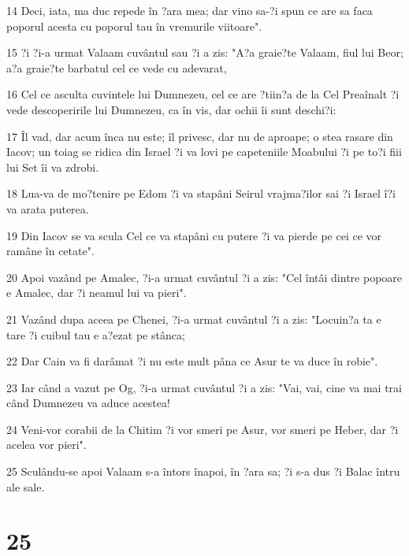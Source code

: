\par 14 Deci, iata, ma duc repede în ?ara mea; dar vino sa-?i spun ce are sa faca poporul acesta cu poporul tau în vremurile viitoare".
\par 15 ?i ?i-a urmat Valaam cuvântul sau ?i a zis: "A?a graie?te Valaam, fiul lui Beor; a?a graie?te barbatul cel ce vede cu adevarat,
\par 16 Cel ce asculta cuvintele lui Dumnezeu, cel ce are ?tiin?a de la Cel Preaînalt ?i vede descoperirile lui Dumnezeu, ca în vis, dar ochii îi sunt deschi?i:
\par 17 Îl vad, dar acum înca nu este; îl privesc, dar nu de aproape; o stea rasare din Iacov; un toiag se ridica din Israel ?i va lovi pe capeteniile Moabului ?i pe to?i fiii lui Set îi va zdrobi.
\par 18 Lua-va de mo?tenire pe Edom ?i va stapâni Seirul vrajma?ilor sai ?i Israel î?i va arata puterea.
\par 19 Din Iacov se va scula Cel ce va stapâni cu putere ?i va pierde pe cei ce vor ramâne în cetate".
\par 20 Apoi vazând pe Amalec, ?i-a urmat cuvântul ?i a zis: "Cel întâi dintre popoare e Amalec, dar ?i neamul lui va pieri".
\par 21 Vazând dupa aceea pe Chenei, ?i-a urmat cuvântul ?i a zis: "Locuin?a ta e tare ?i cuibul tau e a?ezat pe stânca;
\par 22 Dar Cain va fi darâmat ?i nu este mult pâna ce Asur te va duce în robie".
\par 23 Iar când a vazut pe Og, ?i-a urmat cuvântul ?i a zis: "Vai, vai, cine va mai trai când Dumnezeu va aduce acestea!
\par 24 Veni-vor corabii de la Chitim ?i vor smeri pe Asur, vor smeri pe Heber, dar ?i acelea vor pieri".
\par 25 Sculându-se apoi Valaam s-a întors înapoi, în ?ara sa; ?i s-a dus ?i Balac întru ale sale.

\chapter{25}

